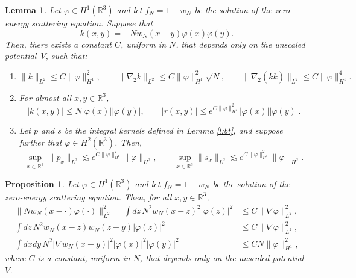 \documentclass[11pt,a4paper,draft,DIV11]{scrartcl}	%
\newtheorem{prp}[thm]{Proposition}
\newtheorem{lem}[thm]{Lemma}
\newcommand{\R}{\mathds{R}}
\newcommand{\norm}[1]{\lVert#1\rVert}	%
\begin{document}
\begin{lem} \label{l:kernels}
  Let $\varphi \in H^1(\R^3)$ and let $f_N=1-w_N$ be the solution of the
  zero-energy scattering equation. Suppose that
  \[
    k(x,y) = - N w_N(x-y) \varphi(x) \varphi(y).
  \]
  Then, there exists a constant $C$, uniform in $N$, that depends only on the
  unscaled potential~$V$, such that: 
  \begin{enumerate}
    \item \label{k}
      $        \| k \|_{L^2} \le C \| \varphi \|_{H^1}^2, \qquad \| \nabla_2 k
        \|_{L^2} \le C \| \varphi \|_{H^1}^2 \sqrt{N}, \qquad \| \nabla_2 (k
        \overline{k}) \|_{L^2} \le C \| \varphi \|_{H^1}^4.      $
    \item \label{kr} For almost all $x,y \in \R^3$,
      \[
        |k(x,y)| \leq N |\varphi(x)| |\varphi(y)|, \qquad |r(x,y)| \le e^{C \|
        \varphi \|_{H^1}^2} |\varphi(x)| |\varphi(y)|.
      \] 
    \item \label{sup} Let $p$ and $s$ be the integral kernels defined in Lemma
      \ref{l:bt}, and suppose further that $\varphi \in H^2(\R^3)$. Then,
      \[
        \sup_{x \in \R^3} \, \norm{p_x}_{L^2} \apprle e^{C \| \varphi
        \|_{H^1}^2} \norm{\varphi}_{H^2}, \qquad \sup_{x \in \R^3}
        \norm{s_x}_{L^2} \apprle e^{C \| \varphi \|_{H^1}^2}
        \norm{\varphi}_{H^2}.
      \]
  \end{enumerate}
\end{lem}


\begin{prp} \label{p:wphi}
  Let $\varphi \in H^1(\R^3)$ and let $f_N=1-w_N$ be the solution of the
  zero-energy scattering equation. Then, for all $x,y \in \R^3$,
  \begin{align*}
    \norm{N w_N(x-\cdot)\varphi(\cdot)}_{L^2}^2 = \int dz \, N^2 w_N(x-z)^2 |\varphi(z)|^2 & \le C \| \nabla \varphi
    \|_{L^2}^2, \\
\int dz \, N^2 w_N(x-z) w_N(z-y) |\varphi(z)|^2 & \le C \| \nabla \varphi
    \|_{L^2}^2, \\
    \int dx dy \, N^2 |\nabla w_N(x-y)|^2 |\varphi(x)|^2 |\varphi(y)|^2 & \le
    C N \| \varphi \|_{H^1}^2,
  \end{align*}
  where $C$ is a constant, uniform in $N$, that depends only on the unscaled
  potential $V$.
\end{prp}
\end{document}
